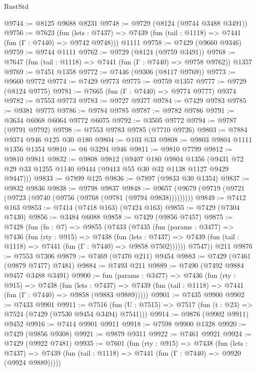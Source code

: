 \begin{lexlean}{RustStd}
\begin{coremodule}
@9744 := @8125 @9688 @8231
@9748 := @9729 (@8124 (@9744 @3488 @3491))
@9756 := @7623
    (fun (lets : @7437) => @7439 (fun (tail : @1118) => @7441 (fun (Γ : @7440) => @9742 @9748)))
    @1111
@9758 := @7429 (@9660 @9346)
@9759 := @9744 @1111
@9762 := @9729 (@8124 (@9759 @3491))
@9768 := @7647 (fun (tail : @1118) => @7441 (fun (Γ : @7440) => @9758 @9762)) @1357
@9769 := @7451 @1358
@9772 := @7446 (@9306 (@8117 @9769))
@9773 := @9660 @9772
@9774 := @7429 @9773
@9775 := @9759 @1357
@9777 := @9729 (@8124 @9775)
@9781 := @7665 (fun (Γ : @7440) => @9774 @9777) @9374
@9782 := @7553 @9773
@9783 := @9727 @9377
@9784 := @7429 @9783
@9785 := @9381 @9775
@9786 := @9784 @9785
@9787 := @9782 @9786
@9791 := @3634 @6068 @6064 @9772 @6075
@9792 := @3505 @9772
@9794 := @9787 (@9791 @9792)
@9798 := @7553 @9783 @9785 (@7710 @9726)
@9803 := @7884 @9374 @946 @125 @30 @180
@9804 := @103 @33
@9808 := @9803 @9804 @1111 @1356 @1354
@9810 := @6 @3294 @946
@9811 := @9810 @7799
@9812 := @9810 @9811
@9832 := @9808
    @9812
    (@9407
      @180
      @9804
      @1356
      (@9431 @72 @29 @33 @1255 @1140 @9444 (@9413 @55 @30 @32 @1138 @1127 @9429 @9447)))
@9833 := @7899 @125
@9836 := @7897 (@9833 @30 @1354)
@9837 := @9832 @9836
@9838 := @9798 @9837
@9848 := @9657 (@9679 (@9719 (@9721 (@9723 (@9740 (@9756 (@9768 (@9781 (@9794 @9838)))))))))
@9849 := @7412 @163
@9853 := @7414 (@7418 @163) (@7424 @163)
@9855 := @7429 (@7304 @7430)
@9856 := @3484 @6088
@9858 := @7429 (@9856 @7457)
@9875 := @7428
    (fun (fn : @7) =>
    @9855
      (@7433
        (@7435
          (fun (params : @3477) =>
          @7436
            (fun (rty : @915) =>
            @7438
              (fun (lets : @7437) =>
              @7439 (fun (tail : @1118) => @7441 (fun (Γ : @7440) => @9858 @7502))))))
        @7547))
    @211
@9876 := @7553 @7306
@9879 := @7469 (@7470 @211) @9454
@9883 := @7429 (@7461 (@9879 @7477) @7481)
@9884 := @7493 @211
@9889 := @7490 (@7492 @9884 @9457 @3488 @3491)
@9900 := fun (params : @3477) =>
  @7436
    (fun (rty : @915) =>
    @7438
      (fun (lets : @7437) =>
      @7439 (fun (tail : @1118) => @7441 (fun (Γ : @7440) => @9858 (@9883 @9889)))))
@9901 := @7435 @9900
@9902 := @7433 @9901
@9911 := @7516 (fun (U : @7515) => @7517 (fun (t : @23) => @7524 (@7429 (@7530 @9454 @3494) @7541)))
@9914 := @9876 (@9902 @9911) @9452
@9916 := @7414 @9901 @9911
@9918 := @7598 @9900 @1328
@9920 := @7429 (@9856 @9308)
@9921 := @9879 @9311
@9922 := @7461 @9921
@9924 := @7429 (@9922 @7481)
@9935 := @7601
    (fun (rty : @915) =>
    @7438
      (fun (lets : @7437) =>
      @7439 (fun (tail : @1118) => @7441 (fun (Γ : @7440) => @9920 (@9924 @9889)))))

\end{coremodule}
\end{lexlean}
